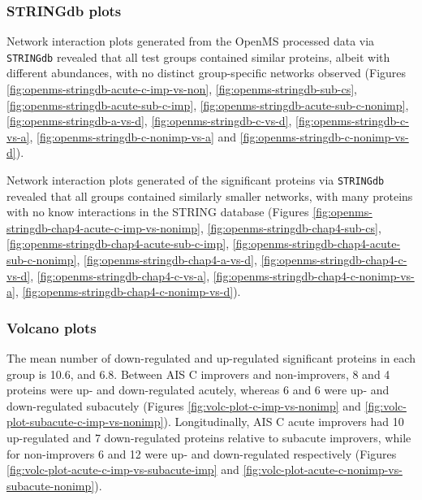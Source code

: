 \documentclass[9pt,lineno]{elife}
\begin{document}
\begin{landscape}
\begin{landscape}
\hypertarget{stringdb-plots}{%
\subsubsection{STRINGdb plots}\label{stringdb-plots}}

Network interaction plots generated from the OpenMS processed data via \texttt{STRINGdb} revealed that all test groups contained similar proteins, albeit with different abundances, with no distinct group-specific networks observed (Figures \ref{fig:openms-stringdb-acute-c-imp-vs-non}, \ref{fig:openms-stringdb-sub-cs}, \ref{fig:openms-stringdb-acute-sub-c-imp}, \ref{fig:openms-stringdb-acute-sub-c-nonimp}, \ref{fig:openms-stringdb-a-vs-d}, \ref{fig:openms-stringdb-c-vs-d}, \ref{fig:openms-stringdb-c-vs-a}, \ref{fig:openms-stringdb-c-nonimp-vs-a} and \ref{fig:openms-stringdb-c-nonimp-vs-d}).

Network interaction plots generated of the significant proteins via \texttt{STRINGdb} revealed that all groups contained similarly smaller networks, with many proteins with no know interactions in the STRING database (Figures \ref{fig:openms-stringdb-chap4-acute-c-imp-vs-nonimp}, \ref{fig:openms-stringdb-chap4-sub-cs}, \ref{fig:openms-stringdb-chap4-acute-sub-c-imp}, \ref{fig:openms-stringdb-chap4-acute-sub-c-nonimp}, \ref{fig:openms-stringdb-chap4-a-vs-d}, \ref{fig:openms-stringdb-chap4-c-vs-d}, \ref{fig:openms-stringdb-chap4-c-vs-a}, \ref{fig:openms-stringdb-chap4-c-nonimp-vs-a}, \ref{fig:openms-stringdb-chap4-c-nonimp-vs-d}).

\hypertarget{volcano-plots}{%
\subsubsection{Volcano plots}\label{volcano-plots}}

The mean number of down-regulated and up-regulated significant proteins in each group is 10.6, and 6.8.
Between AIS C improvers and non-improvers, 8 and 4 proteins were up- and down-regulated acutely, whereas 6 and 6 were up- and down-regulated subacutely (Figures \ref{fig:volc-plot-c-imp-vs-nonimp} and \ref{fig:volc-plot-subacute-c-imp-vs-nonimp}).
Longitudinally, AIS C acute improvers had 10 up-regulated and 7 down-regulated proteins relative to subacute improvers, while for non-improvers 6 and 12 were up- and down-regulated respectively (Figures \ref{fig:volc-plot-acute-c-imp-vs-subacute-imp} and \ref{fig:volc-plot-acute-c-nonimp-vs-subacute-nonimp}).

\hypertarget{comparing-itraq-and-label-free-proteins}{%
}
\end{landscape}
\end{landscape}
\end{document}
